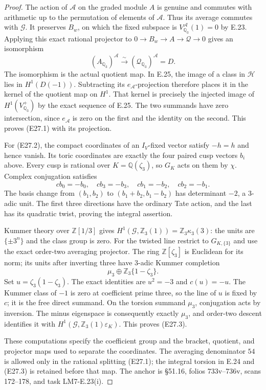 \documentclass[11pt,oneside]{article}
\begin{document}
\begin{proof}
The action of $\mathcal A$ on the graded module $A$ is
genuine and commutes with arithmetic up to the permutation
of elements of $\mathcal A$. Thus its average commutes
with $\mathcal G$. It preserves $B_w$, on which the
fixed subspace is
$V_{\mathbb Q_3}^{\mathcal A}(1)=0$ by E.23.
Applying this exact rational projector to
$0\to B_w\to A\to\mathcal Q\to0$ gives an isomorphism
\[
       (A_{\mathbb Q_3})^{\mathcal A}
                \xrightarrow{\sim}
       (\mathcal Q_{\mathbb Q_3})^{\mathcal A}=D.
\]
The isomorphism is the actual quotient map. In E.25,
the image of a class in $\mathcal H$ lies in $H^1(D(-1))$.
Subtracting its $e_{\mathcal A}$-projection therefore
places it in the kernel of the quotient map on $H^1$.
That kernel is precisely the injected image of
$H^1(V^+_{\mathbb Q_3})$ by the exact sequence of E.25.
The two summands have zero intersection, since
$e_{\mathcal A}$ is zero on the first and the identity
on the second. This proves (E27.1) with its projection.

For (E27.2), the compact coordinates of an
$I_V$-fixed vector satisfy $-h=h$ and hence vanish.
Its toric coordinates are exactly the four paired
cusp vectors $b_i$ above. Every cusp is rational over
$K=\mathbb Q(\zeta_3)$, so $G_K$ acts on them by
$\chi$. Complex conjugation satisfies
\[
 cb_0=-b_0,\quad cb_3=-b_3,\quad
 cb_1=-b_2,\quad cb_2=-b_1.
\]
The basis change from $(b_1,b_2)$ to
$(b_1+b_2,b_1-b_2)$ has determinant $-2$, a
$3$-adic unit. The first three directions have the
ordinary Tate action, and the last has its quadratic
twist, proving the integral assertion.

Kummer theory over $\mathbb Z[1/3]$ gives
$H^1(\mathcal G,\mathbb Z_3(1))=\mathbb Z_3\kappa_3(3)$:
the units are $\{\pm3^n\}$ and the class group is zero.
For the twisted line restrict to $G_{K,\{3\}}$ and use
the exact order-two averaging projector. The ring
$\mathbb Z[\zeta_3]$ is Euclidean for its norm; its
units after inverting three have $3$-adic Kummer
completion
\[
                 \mu_3\oplus\mathbb Z_3\{1-\zeta_3\}.
\]
Set $u=\zeta_3(1-\zeta_3)$. The exact identities are
$u^2=-3$ and $c(u)=-u$. The Kummer class of $-1$
is zero at coefficient prime three, so the line of
$u$ is fixed by $c$; it is the free direct summand.
On the torsion summand $\mu_3$, conjugation acts by
inversion. The minus eigenspace is consequently
exactly $\mu_3$, and order-two descent identifies it
with $H^1(\mathcal G,\mathbb Z_3(1)\varepsilon_K)$.
This proves (E27.3).

These computations specify the coefficient group and
the bracket, quotient, and projector maps used to
separate the coordinates. The averaging denominator
$54$ is allowed only in the rational splitting
(E27.1); the integral torsion in E.24 and (E27.3)
is retained before that map. The anchor is
\S51.16, folios 733v--736v, scans 172--178,
and task LM7-E.23(i).
\end{proof}
\end{document}
